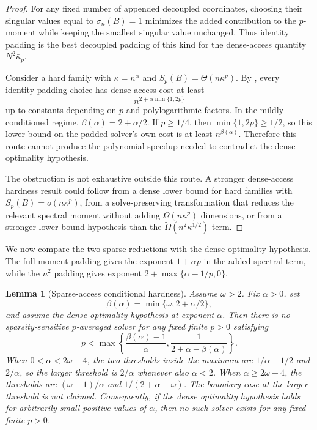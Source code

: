 \documentclass[11pt]{article}
\newtheorem{lemma}{Lemma}[section]
\begin{document}
\begin{proof}
For any fixed number of appended decoupled coordinates, choosing their singular
values equal to $\sigma_n(B)=1$ minimizes the added contribution to the
$p$-moment while keeping the smallest singular value unchanged.  Thus identity
padding is the best decoupled padding of this kind for the dense-access
quantity $N^2\bar{\kappa}_p$.

Consider a hard family with $\kappa=n^{\alpha}$ and
$S_p(B)=\Theta(n\kappa^p)$.  By
, every identity-padding choice
has dense-access cost at least
\[
  n^{2+\alpha\min\{1,2p\}}
\]
up to constants depending on $p$ and polylogarithmic factors.  In the mildly
conditioned regime, $\beta(\alpha)=2+\alpha/2$.  If $p\geq1/4$, then
$\min\{1,2p\}\geq1/2$, so this lower bound on the padded solver's own cost is
at least $n^{\beta(\alpha)}$.  Therefore this route cannot produce the
polynomial speedup needed to contradict the dense optimality hypothesis.

The obstruction is not exhaustive outside this route.  A stronger dense-access
hardness result could follow from a dense lower bound for hard families with
$S_p(B)=o(n\kappa^p)$, from a solve-preserving transformation that reduces the
relevant spectral moment without adding $\Omega(n\kappa^p)$ dimensions, or
from a stronger lower-bound hypothesis than the
$\widetilde{\Omega}(n^2\kappa^{1/2})$ term.
\end{proof}

We now compare the two sparse reductions with the dense optimality hypothesis.
The full-moment padding gives the exponent $1+\alpha p$ in the added spectral
term, while the $n^2$ padding gives exponent $2+\max\{\alpha-1/p,0\}$.

\begin{lemma}[Sparse-access conditional hardness]
\label{lem:conditional-hardness-fixed-p}
Assume $\omega>2$.  Fix $\alpha>0$, set
\[
  \beta(\alpha)=\min\{\omega,2+\alpha/2\},
\]
and assume the dense optimality hypothesis at exponent $\alpha$.  Then there
is no sparsity-sensitive $p$-averaged solver for any fixed finite $p>0$
satisfying
\[
  p<
  \max\left\{
    \frac{\beta(\alpha)-1}{\alpha},
    \frac{1}{2+\alpha-\beta(\alpha)}
  \right\}.
\]
When $0<\alpha<2\omega-4$, the two thresholds inside the maximum are
$1/\alpha+1/2$ and $2/\alpha$, so the larger threshold is $2/\alpha$ whenever
also $\alpha<2$.  When $\alpha\geq2\omega-4$, the thresholds are
$(\omega-1)/\alpha$ and $1/(2+\alpha-\omega)$.  The boundary case at the larger
threshold is not claimed.  Consequently, if the dense optimality hypothesis
holds for arbitrarily small positive values of $\alpha$, then no such solver
exists for any fixed finite $p>0$.
\end{lemma}
\end{document}
